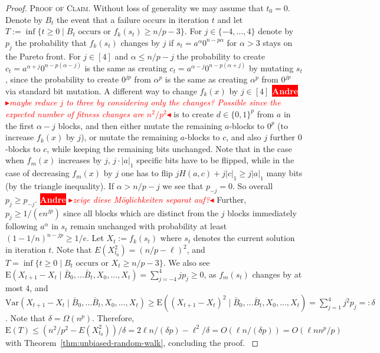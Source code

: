 \documentclass[
sigconf = false, %
review = false, %
screen = true, %
anonymous = true, %
format=acmsmall
]{acmart}
\newcommand{\ones}[1]{|#1|_1}
\newcommand*{\E}{\mathrm{E}}
\newenvironment{proofofclaim}{\textsc{Proof of Claim.}}{\hfill\scriptsize\scalebox{1}{$\blacksquare$}}
\newcommand{\nbc}[3]{
		{\colorbox{#3}{\bfseries\sffamily\scriptsize\textcolor{white}{#1}}}
		{\textcolor{#3}{\sf\small$\blacktriangleright$\textit{#2}$\blacktriangleleft$}}
}
\newcommand{\andre}[1]{\nbc{Andre}{#1}{red}}
\begin{document}
\begin{proof}
\begin{proofofclaim}
	Without loss of generality we may assume that $t_0=0$. Denote by $B_t$ the event that a failure occurs in iteration $t$ and let $T:=\inf\{t \geq 0 \mid B_t \text{ occurs or } f_k(s_t) \geq n/p-3\}$. For $j \in \{-4, \ldots , 4\}$ denote by $p_j$ the probability that $f_k(s_t)$ changes by $j$ if $s_t=a^\alpha 0^{n-p\alpha}$ for $\alpha > 3$ stays on the Pareto front. For $j \in [4]$ and $\alpha \leq n/p-j$ the probability to create $c_t=a^{\alpha+j} 0^{n-p(\alpha-j)}$ is the same as creating $c_t=a^{\alpha-j} 0^{n-p(\alpha+j)}$ by mutating $s_t$, since the probability to create $0^{jp}$ from $\alpha^p$ is the same as creating $\alpha^p$ from $0^{jp}$ via standard bit mutation. A different way to change $f_k(x)$ by $j \in [4]$ \andre{maybe reduce $j$ to three by considering only the changes? Possible since the expected number of fitness changes are $n^2/p^2$} is to create $d \in \{0,1\}^p$ from $a$ in the first $\alpha-j$ blocks, and then either mutate the remaining $a$-blocks to $0^p$ (to increase $f_k(x)$ by $j$), or mutate the remaining $a$-blocks to $c$, and also $j$ further $0$-blocks to $c$, while keeping the remaining bits unchanged. Note that in the case when $f_m(x)$ increases by $j$, $j \cdot \ones{a}$ specific bits have to be flipped, while in the case of decreasing $f_m(x)$ by $j$ one has to flip $jH(a,c)+j \ones{c} \geq j \ones{a}$ many bits (by the triangle inequality). If $\alpha > n/p-j$ we see that $p_{-j}=0$. So overall $p_j \geq p_{-j}$. \andre{zeige diese Möglichkeiten separat auf?} Further, $p_j \geq 1/(en^{jp})$ since all blocks which are distinct from the $j$ blocks immediately following $a^{\alpha}$ in $s_t$ remain unchanged with probability at least $(1-1/n)^{n-jp} \geq 1/e$. Let $X_t:=f_k(s_t)$ where $s_t$ denotes the current solution in iteration $t$. Note that $E(X_{t_0}^2) = (n/p-\ell)^2$, and $T=\inf\{t \geq 0 \mid B_t \text{ occurs or } X_t \geq n/p - 3\}$. We also see $\E(X_{t+1}-X_t \mid \bar{B}_0, \ldots \bar{B}_t,X_0, \ldots , X_t) = \sum_{j=-4}^4 j p_j \geq 0$, as $f_m(s_t)$ changes by at most $4$, and $\text{Var}(X_{t+1}-X_t \mid \bar{B}_0, \ldots \bar{B}_t, X_0, \ldots , X_t) \geq \E((X_{t+1}-X_t)^2 \mid \bar{B}_0, \ldots \bar{B}_t, X_0, \ldots , X_t) = \sum_{j=1}^4 j^2 p_j =:\delta$. Note that $\delta = \Omega(n^p)$. Therefore, $\E(T) \leq (n^2/p^2-E(X_{t_0}^2))/\delta = 2 \ell n/(\delta p)-\ell^2/\delta = O(\ell n/(\delta p)) = O(\ell n n^p/p)$ with Theorem~\ref{thm:unbiased-random-walk}, concluding the proof. 
\end{proofofclaim}


\end{proof}
\end{document}
